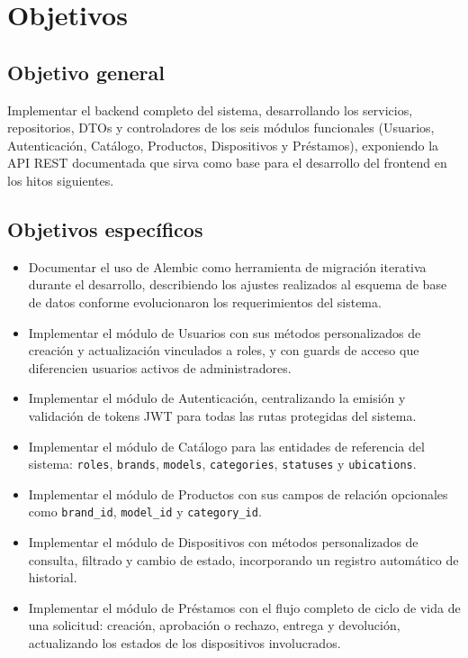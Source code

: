 \section{Objetivos}

\subsection{Objetivo general}

Implementar el backend completo del sistema, desarrollando los servicios, repositorios, 
DTOs y controladores de los seis módulos funcionales (Usuarios, Autenticación, Catálogo, 
Productos, Dispositivos y Préstamos), exponiendo la API REST documentada 
que sirva como base para el desarrollo del frontend en los hitos siguientes.

\subsection{Objetivos específicos}

\begin{itemize}
	\item Documentar el uso de Alembic como herramienta de migración iterativa durante 
	el desarrollo, describiendo los ajustes realizados al esquema de base de datos 
	conforme evolucionaron los requerimientos del sistema.
	
	\item Implementar el módulo de Usuarios con sus métodos personalizados de creación 
	y actualización vinculados a roles, y con guards de acceso que diferencien usuarios 
	activos de administradores.
	
	\item Implementar el módulo de Autenticación, centralizando la emisión y validación de tokens 
	JWT para todas las rutas protegidas del sistema.
	
	\item Implementar el módulo de Catálogo para las 
	entidades de referencia del sistema: \texttt{roles}, \texttt{brands}, 
	\texttt{models}, \texttt{categories}, \texttt{statuses} y \texttt{ubications}.
	
	\item Implementar el módulo de Productos con sus campos de relación opcionales como \texttt{brand\_id}, 
	\texttt{model\_id} y \texttt{category\_id}.
	
	\item Implementar el módulo de Dispositivos con métodos personalizados de consulta, 
	filtrado y cambio de estado, incorporando un registro automático de historial.
	
	\item Implementar el módulo de Préstamos con el flujo completo de ciclo de vida 
	de una solicitud: creación, aprobación o rechazo, entrega y devolución, 
	actualizando los estados de los dispositivos involucrados.
\end{itemize}